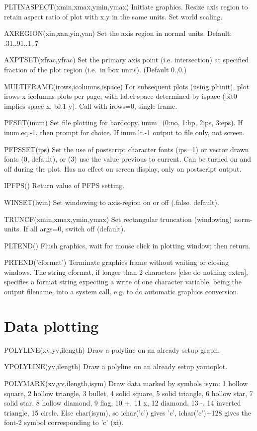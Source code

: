 \documentclass[12pt]{article}
\begin{document}
PLTINASPECT(xmin,xmax,ymin,ymax) Initiate graphics. Resize axis region
to retain aspect ratio of plot with x,y in the same units. Set world scaling.

AXREGION(xin,xan,yin,yan) Set the axis region in normal units.
Default: .31,.91,.1,.7

AXPTSET(xfrac,yfrac) Set the primary axis point (i.e. intersection) at specified
fraction of the plot region (i.e.\ in box units). (Default 0.,0.)

MULTIFRAME(irows,icolumns,ispace) For subsequent plots (using pltinit),
plot irows x icolumns plots per page, with label space determined by
ispace (bit0 implies space x, bit1 y). Call with irows=0, single frame.

PFSET(inum) Set file plotting for hardcopy. inum=(0:no, 1:hp, 2:ps, 3:eps).
If inum.eq.-1, then prompt for choice. If inum.lt.-1 output to file
only, not screen.

PFPSSET(ips) Set the use of postscript character fonts (ips=1) or vector
drawn fonts (0, default), or (3) use the value previous to current.
Can be turned on and off during the plot. Has no effect on screen
display, only on postscript output.

IPFPS() Return value of PFPS setting.

WINSET(lwin) Set windowing to axis-region on or off (.false. default).

TRUNCF(xmin,xmax,ymin,ymax) Set rectangular truncation (windowing) norm-units.
If all args=0, switch off (default).

PLTEND() Flush graphics, wait for mouse click in plotting window; then
return.

PRTEND('cformat') Terminate graphics frame without waiting or closing
windows. The string cformat, if longer than 2 characters [else do
nothing extra], specifies a format string expecting a write of one
character variable, being the output filename, into a system call,
e.g. to do automatic graphics conversion.

\section{Data plotting}

POLYLINE(xv,yv,ilength) Draw a polyline on an already setup graph.

YPOLYLINE(yv,ilength) Draw a polyline on an already setup yautoplot.

POLYMARK(xv,yv,ilength,isym) Draw data marked by symbols isym:
1 hollow square, 2 hollow triangle, 3 bullet, 4 solid square, 5 solid 
triangle, 6 hollow star, 7 solid star, 8 hollow diamond, 9 flag, 10 +,
11 x, 12 diamond, 13 -, 14 inverted triangle, 15 circle. Else
char(isym), so ichar('c') gives 'c', ichar('c')+128 gives the font-2
symbol corresponding to 'c' (xi).
\end{document}
